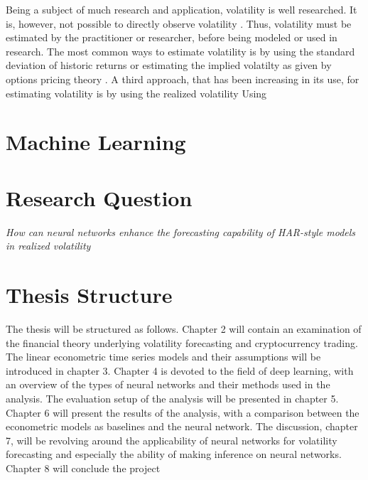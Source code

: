 Being a subject of much research and application, volatility is well researched.
It is, however, not possible to directly observe volatility \cite[p. 98]{tsayAnalysisFinancialTime2005}.
Thus, volatility must be estimated by the practitioner or researcher, before being modeled or used in research.
The most common ways to estimate volatility is by using the standard deviation of historic returns or estimating the implied volatilty as given by options pricing theory \cite[p. 98]{tsayAnalysisFinancialTime2005} \cite[p. 325]{hullOptionsFuturesOther2015a}.
A third approach, that has been increasing in its use, for estimating volatility is by using the realized volatility \cite{andersenAnsweringSkepticsYes1998a}
Using 



\section{Machine Learning}
\label{sec:org92l9ha9}

\section{Research Question}
\label{sec:org6232157}
\emph{How can neural networks enhance the forecasting capability of HAR-style models in realized volatility}

\section{Thesis Structure}
\label{sec:org6i32l57}
The thesis will be structured as follows.
Chapter 2 will contain an examination of the financial theory underlying volatility forecasting and cryptocurrency trading.
The linear econometric time series models and their assumptions will be introduced in chapter 3.
Chapter 4 is devoted to the field of deep learning, with an overview of the types of neural networks and their methods used in the analysis.
The evaluation setup of the analysis will be presented in chapter 5.
Chapter 6 will present the results of the analysis, with a comparison between the econometric models as baselines and the neural network.
The discussion, chapter 7, will be revolving around the applicability of neural networks for volatility forecasting and especially the ability of making inference on neural networks.
Chapter 8 will conclude the project

